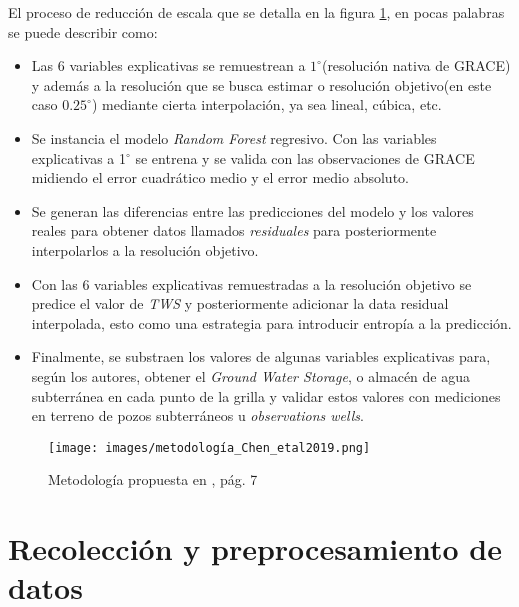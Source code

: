El proceso de reducción de escala que se detalla en la figura \ref{metodologia}, en pocas palabras se puede describir
como:
\begin{itemize}

    \item Las 6 variables explicativas se remuestrean a $1^{\circ}$(resolución 
    nativa de GRACE) y además a la resolución que se busca estimar o resolución objetivo(en este caso $0.25^{\circ}$) mediante 
    cierta interpolación, ya sea lineal, cúbica, etc.

    \item Se instancia el modelo \textit{Random Forest} regresivo. Con las variables explicativas a 1$^{\circ}$ se entrena y se valida
    con las observaciones de GRACE midiendo el error cuadrático medio y el error medio absoluto.
    
    \item Se generan las diferencias entre las predicciones del modelo y los valores reales para obtener
    datos llamados \textit{residuales} para posteriormente interpolarlos a la resolución objetivo.

    \item Con las 6 variables explicativas remuestradas a la resolución objetivo se predice el valor de \textit{TWS}
    y posteriormente adicionar la data residual interpolada, esto como una estrategia para introducir entropía a la predicción.
    
    \item Finalmente, se substraen los valores de algunas variables explicativas para, según los autores, obtener el 
    \textit{Ground Water Storage}, o almacén de agua subterránea en cada punto de la grilla y validar estos valores con
    mediciones en terreno de pozos subterráneos u \textit{observations wells}.
    
\end{itemize}

\begin{figure}[ht]
    \centering
          \texttt{[image: images/metodología\_Chen\_etal2019.png]}
          \vskip -0.1in
    \caption[Metodología de reducción de dimensión propuesta]{\footnotesize Metodología propuesta en \cite{11}, pág. 7}
    \label{metodologia}
\end{figure}


%
%
%
%
\section{Recolección y preprocesamiento de datos}


